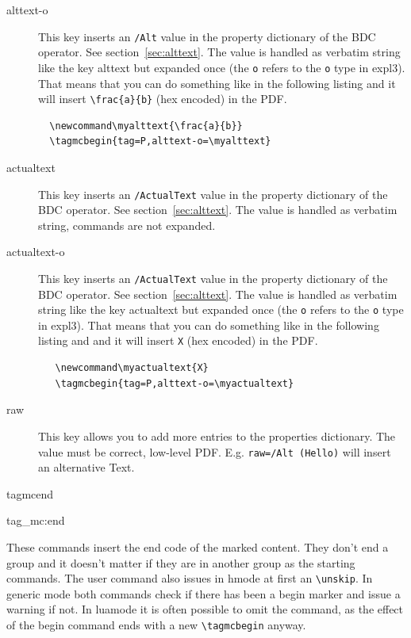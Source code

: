 \documentclass[DIV=12,parskip=half-,bibliography=totoc]{scrartcl}
\newcommand\PrintKeyName[1]{\textsf{#1}}
\newcommand\PDF{PDF}
\begin{document}
\begin{description}
  \item[\PrintKeyName{alttext-o}]
  This key inserts an \texttt{/Alt} value in the property dictionary of the BDC operator. See section~\ref{sec:alttext}. The value is handled as verbatim string like the key \PrintKeyName{alttext} but expanded once (the \texttt{o} refers to the \texttt{o} type in expl3).
  That means that you can do something like in the following listing
  and it will insert \verb+\frac{a}{b}+  (hex encoded) in the \PDF{}.

  \begin{lstlisting}
  \newcommand\myalttext{\frac{a}{b}}
  \tagmcbegin{tag=P,alttext-o=\myalttext}
  \end{lstlisting}




  \item[\PrintKeyName{actualtext}]
  This key inserts an \texttt{/ActualText} value in the property dictionary of the BDC operator. See section~\ref{sec:alttext}. The value is handled as verbatim string, commands are not expanded.


  \item[\PrintKeyName{actualtext-o}]
  This key inserts an \texttt{/ActualText} value in the property dictionary of the BDC operator. See section~\ref{sec:alttext}. The value is handled as verbatim string like the key \PrintKeyName{actualtext} but expanded once (the \texttt{o} refers to the \texttt{o} type in expl3). That means that you can do something like in the following listing and and it will insert \verb+X+ (hex encoded)  in the \PDF{}.


  \begin{lstlisting}
   \newcommand\myactualtext{X}
   \tagmcbegin{tag=P,alttext-o=\myactualtext}
  \end{lstlisting}

  \item[\PrintKeyName{raw}]
  This key allows you to add more entries to the properties dictionary. The value must be correct, low-level \PDF{}. E.g. \verb+raw=/Alt (Hello)+ will insert an alternative Text.
\end{description}


\begin{docCommand}{tagmcend}{}\end{docCommand}
\begin{docCommand}{tag_mc:end}{}\end{docCommand}

These commands insert the end code of the marked content. They don't end a group and it doesn't matter if they are in another group as the starting commands. The user command also issues in hmode at first an \verb+\unskip+. In generic mode both commands check if there has been a begin marker and issue a warning if not. In luamode it is often possible to omit the command, as the effect of the begin command ends  with a new \verb+\tagmcbegin+ anyway.
\end{document}
